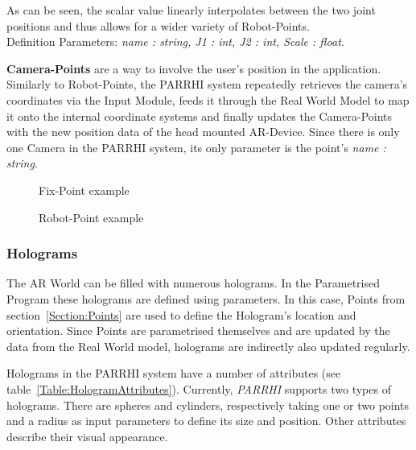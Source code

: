 As can be seen, the scalar value linearly interpolates between the two joint positions and thus allows for a wider variety of Robot-Points.\\Definition Parameters: \textit{name : string, J1 : int, J2 : int, Scale : float}.

\textbf{Camera-Points} are a way to involve the user's position in the application. Similarly to Robot-Points, the PARRHI system repeatedly retrieves the camera's coordinates via the Input Module, feeds it through the Real World Model to map it onto the internal coordinate systems and finally updates the Camera-Points with the new position data of the head mounted AR-Device. Since there is only one Camera in the PARRHI system, its only parameter is the point's \textit{name : string}.


\begin{figure}[!h]
	\begin{minipage}{0.45\textwidth}
		\centering
		
		\caption{Fix-Point example}
		\label{InputData:PointFix}
	\end{minipage}\hfill
	\begin{minipage}{0.45\textwidth}
		\centering
		
		\caption{Robot-Point example}
		\label{InputData:PointRobot}
	\end{minipage}
\end{figure}

\subsubsection{Holograms}\label{Section:Holograms}
The AR World can be filled with numerous holograms. In the Parametrised Program these holograms are defined using parameters. In this case, Points from section~\ref{Section:Points} are used to define the Hologram's location and orientation. Since Points are parametrised themselves and are updated by the data from the Real World model, holograms are indirectly also updated regularly.

Holograms in the PARRHI system have a number of attributes (see table~\ref{Table:HologramAttributes}). Currently, \textit{PARRHI} supports two types of holograms. There are spheres and cylinders, respectively taking one or two points and a radius as input parameters to define its size and position. Other attributes describe their visual appearance.

